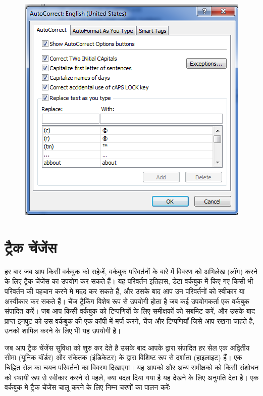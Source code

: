 \begin{figure}[H]
\centering
\includegraphics[scale=0.4]{src/images/chapter1/chapter1_fig67.png}
\end{figure}												

\section{ट्रैक चेंजेंस}\label{id-1.41}

हर बार जब आप किसी वर्कबुक को सहेजें, वर्कबुक परिवर्तनों के बारे में विवरण को अभिलेख (लॉग) करने के लिए ट्रैक चेंजेंस का उपयोग कर सकते हैं। यह परिवर्तन इतिहास, डेटा वर्कबुक में किए गए किसी भी परिवर्तन की पहचान करने मे मदद कर सकते हैं, और उसके बाद आप उन परिवर्तनों को स्वीकार या अस्वीकार कर सकते हैं। चेंज ट्रैकिंग विशेष रूप से उपयोगी होता है जब कई उपयोगकर्ता एक वर्कबुक संपादित करें। जब आप किसी वर्कबुक को टिप्पणियों के लिए समीक्षकों को सबमिट करें, और उसके बाद प्राप्त इनपुट को उस वर्कबुक की एक कॉपी में मर्ज करने, चेंज और टिप्पणियाँ जिसे आप रखना चाहते है, उनको शामिल करने के लिए भीे यह उपयोगी है।


जब आप ट्रैक चेंजेंस सुविधा को शुरु कर देते है उसके बाद आपके द्वारा संपादित हर सेल एक अद्वितीय सीमा (यूनिक बॉर्डर) और संकेतक (इंडिकेटर) के द्वारा विशिष्ट रूप से दर्शाता (हाइलाइट) हैं। एक चिह्नित सेल का चयन परिवर्तनो का विवरण दिखाएगा। यह आपको और अन्य समीक्षको को किसी संशोधन को स्थायी रूप से स्वीकार करने से पहले, क्या बदल दिया गया है यह देखने के लिए अनुमति देता है। एक वर्कबुक मे ट्रैक चेंजेंस चालू करने के लिए निम्न चरणों का पालन करेंः
				
